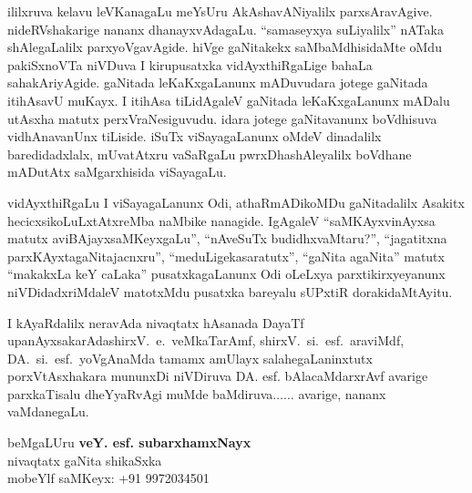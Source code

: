ililxruva kelavu leVKanagaLu meYsUru AkAshavANiyalilx parxsAravAgive. nideRV\-shakarige nananx dhanayxvAdagaLu. ``samaseyxya suLiyalilx'' nATaka shAlegaLalilx parxyoVga\-vAgide. hiVge gaNitakekx saMbaMdhisidaMte oMdu 
pakiSxnoVTa niVDuva I kirupusatxka vidAyxthiR\-gaLige bahaLa sahakAriyAgide. gaNitada leKaKxgaLanunx mADuvudara jotege gaNitada itihAsavU muKayx. I itihAsa tiLidAgaleV gaNitada leKaKxgaLanunx mADalu utAsxha matutx perxVraNesiguvudu. idara jotege gaNitavanunx boVdhisuva vidhAnavanUnx tiLiside. iSuTx viSayagaLanunx oMdeV dinadalilx baredidadxlalx, mUvatAtxru vaSaRgaLu pwrxDhashAle\-yalilx boVdhane mADutAtx saMgarxhisida viSayagaLu.

vidAyxthiRgaLu I viSayagaLanunx Odi, athaRmADikoMDu gaNitadalilx Asakitx\- hecicxsikoLuLxtAtxreMba naMbike nanagide. IgAgaleV ``saMKAyxvinAyxsa matutx aviBAjayx\break saMKeyxgaLu'',  ``nAveSuTx budidhxvaMtaru?'', ``jagatitxna parxKAyxtagaNitajacnxru'', ``meduLige\break kasaratutx'', ``gaNita agaNita'' matutx ``makakxLa keY caLaka'' pusatxkagaLanunx Odi oLeLxya parxtikirxye\-yanunx niVDi\-dadxriMdaleV matotxMdu pusatxka bareyalu sUPxtiR dorakidaMtAyitu.

I kAyaRdalilx neravAda nivaqtatx hAsanada DayaTf upanAyxsakarAda\break shirxV.~e.~veMkaTarAmf, shirxV.~si.~esf.~araviMdf, 
DA.~si.~esf.~yoVgAnaMda tamamx amUlayx salahegaLaninxtutx porxVtAsxhakara mununxDi niVDiruva DA. esf. bAlacaMdarxrAvf avarige parxkaTisalu dheYyaRvAgi muMde baMdiruva$\ldots\ldots$ avarige, nananx vaMdanegaLu.

\begin{flushright}
beMgaLUru \hfill{\bf veY. esf. subarxhamxNayx}\hfill\\
nivaqtatx gaNita shikaSxka\\
mobeYlf saMKeyx: {\rm +91 9972034501}
\end{flushright}






\newpage

